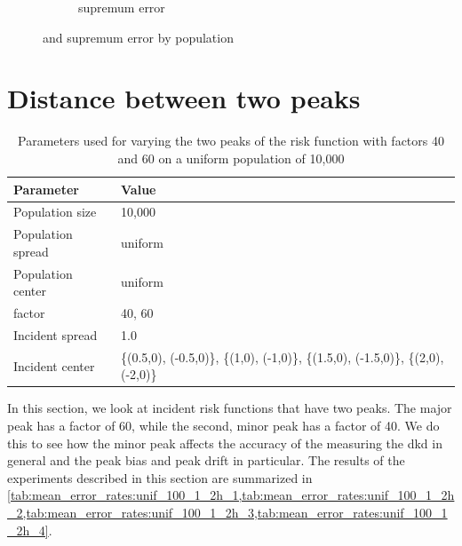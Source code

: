 \begin{figure}[htbp]
\begin{subfigure}[t]{0.24\textwidth}
        \caption{\Gls{supremum error}}
        \label{fig:other_measures:pSD_100_1h:maxerr}
    \end{subfigure}
    \caption{ and \Gls{supremum error} by population }
    \label{fig:other_measures:pSD_100_1h}
\end{figure}

\section{Distance between two peaks}
\label{sec:results:p1.4_100_G}

\begin{table}[htbp]
    \centering
    \begin{tabular}{ll}
        \toprule
        Parameter & Value \\
        \midrule
        Population size & 10,000 \\
        Population \gls{spread} & uniform \\
        Population center & uniform \\
        \Gls{factor} & 40, 60 \\
        Incident \gls{spread} & 1.0 \\
        Incident center & \{(0.5,0), (-0.5,0)\},  \{(1,0), (-1,0)\}, \{(1.5,0), (-1.5,0)\}, \{(2,0), (-2,0)\}\\
        \bottomrule
    \end{tabular}
    \caption{Parameters used for varying the two peaks of the risk function with \glspl{factor} 40 and 60 on a uniform population of 10,000}
    \label{tab:params:p1.4_100_G}
\end{table}

In this section, we look at incident risk functions that have two peaks.
The major peak has a \gls{factor} of 60, while the second, minor peak has a \gls{factor} of 40.
We do this to see how the minor peak affects the accuracy of the measuring the \gls{dkd} in general and the \gls{peak bias} and \gls{peak drift} in particular.
The results of the experiments described in this section are summarized in \cref{tab:mean_error_rates:unif_100_1_2h_1,tab:mean_error_rates:unif_100_1_2h_2,tab:mean_error_rates:unif_100_1_2h_3,tab:mean_error_rates:unif_100_1_2h_4}.


